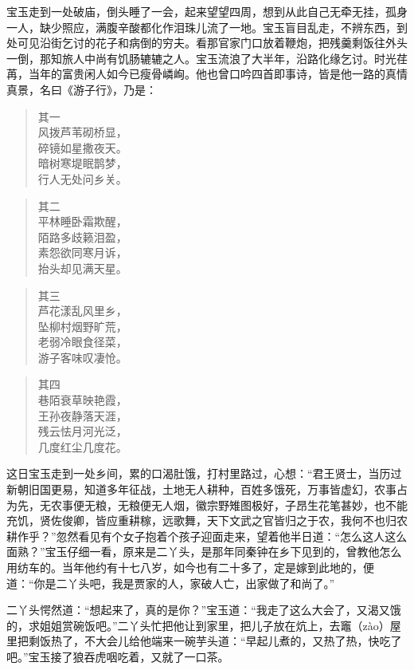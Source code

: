 \documentclass[12pt,oneside]{book}
\newenvironment{shici}{%
\begin{verse}%
\centering\large\hspace{12pt}}%
{\end{verse}}
\begin{document}
宝玉走到一处破庙，倒头睡了一会，起来望望四周，想到从此自己无牵无挂，孤身一人，缺少照应，满腹辛酸都化作泪珠儿流了一地。宝玉盲目乱走，不辨东西，到处可见沿街乞讨的花子和病倒的穷夫。看那官家门口放着鞭炮，把残羹剩饭往外头一倒，那知旅人中尚有饥肠辘辘之人。宝玉流浪了大半年，沿路化缘乞讨。时光荏苒，当年的富贵闲人如今已瘦骨嶙峋。他也曾口吟四首即事诗，皆是他一路的真情真景，名曰《游子行》，乃是：

\begin{shici}
其一 \\
风拨芦苇砌桥显，\\
碎镜如星撒夜天。\\
暗树寒堤眠鹊梦，\\
行人无处问乡关。 
\end{shici}


\begin{shici}
其二 \\
平林睡卧霜欺醒，\\
陌路多歧籁泪盈，\\
素怨欲同寒月诉，\\
抬头却见满天星。
\end{shici}

\begin{shici}
其三 \\
芦花漾乱风里乡，\\
坠柳村烟野旷荒，\\
老弱冷眼食径菜，\\
游子客味叹凄怆。 
\end{shici}

\begin{shici}
其四 \\
巷陌衰草映艳霞，\\
王孙夜静落天涯，\\
残云怯月河光泛，\\
几度红尘几度花。
\end{shici}


这日宝玉走到一处乡间，累的口渴肚饿，打村里路过，心想：“君王贤士，当历过新朝旧国更易，知道多年征战，土地无人耕种，百姓多饿死，万事皆虚幻，农事占为先，无农事便无粮，无粮便无人烟，徽宗野雉图极好，子昂生花笔甚妙，也不能充饥，贤佐俊卿，皆应重耕稼，远歌舞，天下文武之官皆归之于农，我何不也归农耕作乎？”忽然看见有个女子抱着个孩子迎面走来，望着他半日道：“怎么这人这么面熟？”宝玉仔细一看，原来是二丫头，是那年同秦钟在乡下见到的，曾教他怎么用纺车的。当年他约有十七八岁，如今也有二十多了，定是嫁到此地的，便道：“你是二丫头吧，我是贾家的人，家破人亡，出家做了和尚了。”

二丫头愕然道：“想起来了，真的是你？”宝玉道：“我走了这么大会了，又渴又饿的，求姐姐赏碗饭吧。”二丫头忙把他让到家里，把儿子放在炕上，去竈（zào）屋里把剩饭热了，不大会儿给他端来一碗芋头道：“早起儿煮的，又热了热，快吃了吧。”宝玉接了狼吞虎咽吃着，又就了一口茶。
\end{document}
